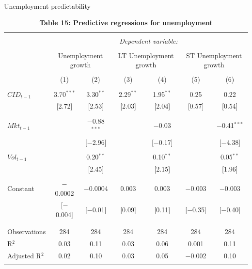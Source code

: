 \documentclass{beamer}
\begin{document}
\scriptsize
{\renewcommand{\arraystretch}{0.8}
\begin{frame}{Unemployment predictability}
\begin{table}[!htbp] \centering 
  \caption*{\textbf{Table 15: Predictive regressions for unemployment}} 
\begin{tabular}{@{\extracolsep{-2pt}}lcccccc} 
\\[-1.8ex]\hline 
\hline \\[-1.5ex] 
 & \multicolumn{6}{c}{\textit{Dependent variable:}} \\ 
\cline{2-7} \\[-1ex]
 & \multicolumn{2}{c}{Unemployment growth} & \multicolumn{2}{c}{LT Unemployment growth} & \multicolumn{2}{c}{ST Unemployment growth} \\ 
\\[-1.8ex] & (1) & (2) & (3) & (4) & (5) & (6)\\ 
\hline \\[-1ex] 
 $CID_{t-1}$ & 3.70$^{***}$ & 3.30$^{**}$ & 2.29$^{**}$ & 1.95$^{**}$ & 0.25 & 0.22 \\ 
  & [2.72] & [2.53] & [2.03] & [2.04] & [0.57] & [0.54] \\ 
  & & & & & & \\ 
 $Mkt_{t-1}$ &  & $-$0.88$^{***}$ &  & $-$0.03 &  & $-$0.41$^{***}$ \\ 
  &  & [$-$2.96] &  & [$-$0.17] &  & [$-$4.38] \\ 
  & & & & & & \\ 
 $Vol_{t-1}$ &  & 0.20$^{**}$ &  & 0.10$^{**}$ &  & 0.05$^{**}$ \\ 
  &  & [2.45] &  & [2.15] &  & [1.96] \\ 
  & & & & & & \\ 
 Constant & $-$0.0002 & $-$0.0004 & 0.003 & 0.003 & $-$0.003 & $-$0.003 \\ 
  & [$-$0.004] & [$-$0.01] & [0.09] & [0.11] & [$-$0.35] & [$-$0.40] \\ 
  & & & & & & \\ 
\hline \\[-1.8ex] 
Observations & 284 & 284 & 284 & 284 & 284 & 284 \\ 
R$^{2}$ & 0.03 & 0.11 & 0.03 & 0.06 & 0.001 & 0.11 \\ 
Adjusted R$^{2}$ & 0.02 & 0.10 & 0.03 & 0.05 & $-$0.002 & 0.10 \\ 
\hline 
\hline \\[-1.8ex] 
\end{tabular} 
\end{table}
\end{frame}
}
\end{document}
